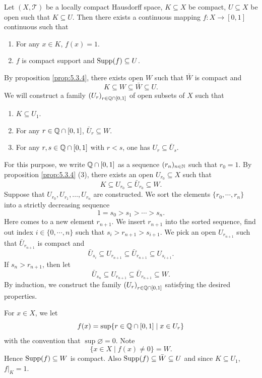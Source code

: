 \begin{lemmaenv}
    Let $(X,\mathscr{T})$ be a locally compact Hausdorff space,
    $K \subseteq X$ be compact, $U \subseteq X$ be open such that $K \subseteq U$.
    Then there exists a continuous mapping $f : X \rightarrow [0,1]$ continuous such that
    \begin{enumerate}
        \item For any $x \in K$, $f(x) = 1$.
        \item $f$ is compact support and $\operatorname{\mathrm{Supp}}(f) \subseteq U$.
    \end{enumerate}
\end{lemmaenv}
\begin{proofenv}
    By proposition \ref{prop:5.3.4}, there exists open $W$ such that $\bar{W}$ is compact and
    $$K\subseteq W \subseteq \bar{W} \subseteq U.$$
    We will construct a family $\left(U_r\right)_{r\in \mathbb{Q}\cap[0,1]}$ of open subsets of $X$ such that
    \begin{enumerate}
        \item $K \subseteq U_1$.
        \item For any $r \in \mathbb{Q}\cap[0,1]$, $\bar{U}_{r} \subseteq W$.
        \item For any $r,s \in \mathbb{Q} \cap [0,1]$ with $r < s$, one has $U_r \subseteq \bar{U}_{s}$.
    \end{enumerate}
    For this purpose, we write $\mathbb{Q}\cap[0,1]$ as a sequence $(r_n)_{n\in\mathbb{N}}$ such that $r_0 = 1$.
    By proposition \ref{prop:5.3.4} (3), there exists an open $U_{r_0} \subseteq X$ such that
    $$K \subseteq U_{r_0} \subseteq \bar{U}_{r_0} \subseteq W.$$ 
    Suppose that $U_{r_0}, U_{r_1}, \ldots, U_{r_{n}}$ are constructed.
    We sort the elements $\{r_0,\cdots,r_n\}$ into a strictly decreasing sequence
    $$1 = s_0 > s_1 > \cdots > s_n.$$
    Here comes to a new element $r_{n+1}$.
    We insert $r_{n+1}$ into the sorted sequence, find out index $i \in \{0,\cdots,n\}$ such that $s_i > r_{n+1} > s_{i+1}$.
    We pick an open $U_{r_{n+1}}$ such that $\bar{U}_{r_{n+1}}$ is compact and
    $$\bar{U}_{s_i} \subseteq U_{r_{n+1}} \subseteq \bar{U}_{r_{n+1}} \subseteq U_{s_{i+1}}.$$
    If $s_n > r_{n+1}$, then let
    $$\bar{U}_{s_n} \subseteq U_{r_{n+1}} \subseteq \bar{U}_{r_{n+1}} \subseteq W.$$
    By induction, we construct the family $\left(U_r\right)_{r\in \mathbb{Q}\cap[0,1]}$ satisfying the desired properties.

    \quad For $x \in X$, we let
    $$f(x) = \sup\{r \in \mathbb{Q}\cap[0,1] \mid x \in U_r\}$$
    with the convention that $\sup \varnothing = 0$.
    Note
    $$\{x \in X \mid f(x) \neq 0\} = W.$$
    Hence $\operatorname{\mathrm{Supp}}(f) \subseteq W$ is compact.
    Also $\operatorname{\mathrm{Supp}}(f) \subseteq \bar{W} \subseteq U$ and since $K \subseteq U_1$, $f|_K = 1$.
    

\end{proofenv}
